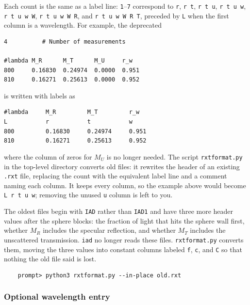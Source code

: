 \documentclass{article}
\newcommand\iadprog{\texttt{iad}}
\begin{document}
Each count is the same as a label line: \texttt{1}--\texttt{7} correspond to
\texttt{r}, \texttt{r t}, \texttt{r t u}, \texttt{r t u w}, \texttt{r t u w W},
\texttt{r t u w W R}, and \texttt{r t u w W R T}, preceded by \texttt{L} when
the first column is a wavelength.  For example, the deprecated
\begin{center}
\begin{minipage}{6cm}
\scriptsize
\begin{verbatim}
4          # Number of measurements

#lambda M_R      M_T      M_U     r_w
800     0.16830  0.24974  0.0000  0.951
810     0.16271  0.25613  0.0000  0.952
\end{verbatim}
\end{minipage}
\end{center}
is written with labels as
\begin{center}
\begin{minipage}{6cm}
\scriptsize
\begin{verbatim}
#lambda     M_R         M_T         r_w
L           r           t           w
800         0.16830     0.24974     0.951
810         0.16271     0.25613     0.952
\end{verbatim}
\end{minipage}
\end{center}
where the column of zeros for $M_U$ is no longer needed.  The script
\texttt{rxtformat.py} in the top-level directory converts old files: it
rewrites the header of an existing \texttt{.rxt} file, replacing the count
with the equivalent label line and a comment naming each column.  It keeps
every column, so the example above would become \texttt{L r t u w}; removing
the unused \texttt{u} column is left to you.

The oldest files begin with \texttt{IAD} rather than \texttt{IAD1} and have
three more header values after the sphere blocks: the fraction of light that
hits the sphere wall first, whether $M_R$ includes the specular reflection, and
whether $M_T$ includes the unscattered transmission.  \iadprog{} no longer reads
these files.  \texttt{rxtformat.py} converts them, moving the three values into
constant columns labeled \texttt{f}, \texttt{c}, and \texttt{C} so that
nothing the old file said is lost.
\begin{verbatim}
    prompt> python3 rxtformat.py --in-place old.rxt
\end{verbatim}

\subsubsection{Optional wavelength entry}
\end{document}
